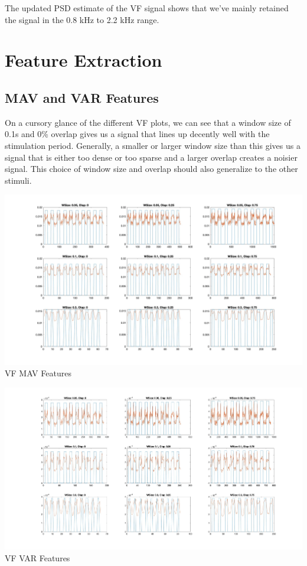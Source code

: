 \documentclass[12pt]{article}
\begin{document}
The updated PSD estimate of the VF signal shows that we've mainly retained the signal in the 0.8 kHz to 2.2 kHz range.

\section{Feature Extraction}
\subsection{MAV and VAR Features}
On a cursory glance of the different VF plots, we can see that a window size of 0.1s and 0\% overlap gives us a signal that lines up decently well with the stimulation period. Generally, a smaller or larger window size than this gives us a signal that is either too dense or too sparse and a larger overlap creates a noisier signal. This choice of window size and overlap should also generalize to the other stimuli.

\begin{center}
    \includegraphics[width=\textwidth]{wsize_olaps_mav.jpg}
    VF MAV Features
\end{center}

\begin{center}
    \includegraphics[width=\textwidth]{wsize_olaps_var.jpg}
    VF VAR Features
\end{center}
\end{document}
